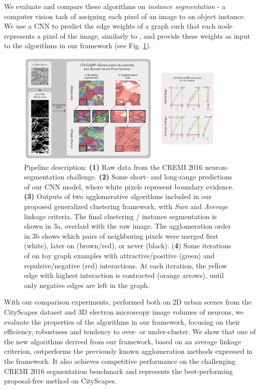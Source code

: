 We evaluate and compare these algorithms on \emph{instance segmentation} - a computer vision task of assigning each pixel of an image to an object instance. 
We use a CNN to predict the edge weights of a graph such that each node represents a pixel of the image, similarly to \cite{liu2018affinity,lee2017superhuman,wolf2018mutex}, and provide these weights as input to the algorithms in our framework (see Fig. \ref{fig:intro_figure}). 

\begin{figure}[t]
\centering
\includegraphics[width=0.9\textwidth]{figs/intro_image_v3.pdf} %
\caption{ Pipeline description: \textbf{(1)} Raw data from the CREMI 2016 neuron-segmentation challenge. \textbf{(2)} Some short- and long-range predictions of our CNN model, where white pixels represent boundary evidence. \textbf{(3)} Outputs of two agglomerative algorithms included in our proposed generalized clustering framework, with \emph{Sum} and \emph{Average} linkage criteria. The final clustering / instance segmentation is shown in 3a, overlaid with the raw image.  The  agglomeration order in 3b shows which pairs of neighboring pixels were merged first (white), later on (brown/red), or never (black). (\textbf{4}) Some iterations of \algname{} on toy graph examples with attractive/positive (green) and repulsive/negative (red) interactions. At each iteration, the yellow edge with highest interaction is contracted (orange arrows), until only negative edges are left in the graph.
\label{fig:intro_figure}}
\end{figure}


With our comparison experiments, performed both on 2D urban scenes from the CityScapes dataset and 3D electron microscopy image volumes of neurons, we evaluate the properties of the algorithms in our framework, focusing on their efficiency, robustness and tendency to over- or under-cluster.
We show that one of the new algorithms derived from our framework, based on an average linkage criterion, outperforms the previously known agglomeration methods expressed in the framework.  
It also achieves competitive performance on the challenging CREMI 2016 segmentation benchmark and represents the best-performing proposal-free method on CityScapes.


